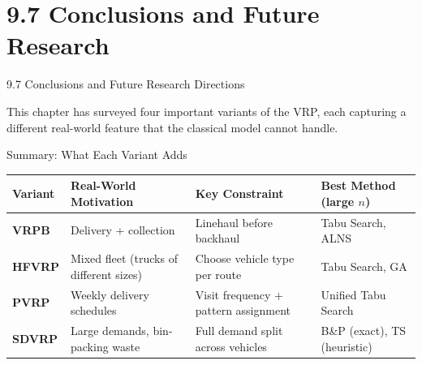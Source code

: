 \documentclass[aspectratio=169,10pt]{beamer}
\begin{document}
\section{9.7 Conclusions and Future Research}

\begin{frame}[allowframebreaks]{9.7 Conclusions and Future Research Directions}

This chapter has surveyed four important variants of the VRP, each capturing
a different real-world feature that the classical model cannot handle.

\begin{block}{Summary: What Each Variant Adds}
  \begin{center}
  \renewcommand{\arraystretch}{1.4}
  \begin{tabular}{>{\bfseries}p{1.8cm}p{3.5cm}p{2.8cm}p{3.2cm}}
    \toprule
    Variant & Real-World Motivation & Key Constraint & Best Method (large $n$) \\
    \midrule
    VRPB  & Delivery + collection
           & Linehaul before backhaul
           & Tabu Search, ALNS \\
    HFVRP & Mixed fleet (trucks of different sizes)
           & Choose vehicle type per route
           & Tabu Search, GA \\
    PVRP  & Weekly delivery schedules
           & Visit frequency + pattern assignment
           & Unified Tabu Search \\
    SDVRP & Large demands, bin-packing waste
           & Full demand split across vehicles
           & B\&P (exact), TS (heuristic) \\
    \bottomrule
  \end{tabular}
  \end{center}
\end{block}

\framebreak


\end{frame}
\end{document}
